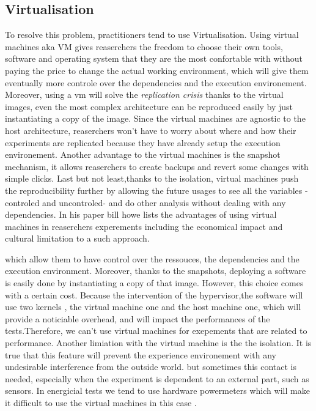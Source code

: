 \subsection{Virtualisation}
To resolve this problem, practitioners tend to use Virtualisation. Using virtual machines aka VM gives reaserchers the freedom to choose their own tools, software and operating system that they are the most confortable with without paying the price to change the actual working environment, which will give them eventually more controle over the dependencies and the execution environement. Moreover, using a vm will solve the \emph{replication crisis} thanks to the virtual images, even the most complex architecture can be reproduced easily by just instantiating a copy of the image. Since the virtual machines are agnostic to the host architecture, reaserchers won't have to worry about where and how their experiments are replicated because they have already setup the execution environement. Another advantage to the virtual machines is the snapshot mechanism, it allows reaserchers to create backups and revert some changes with simple clicks. Last but not least,thanks to the isolation, virtual machines push the reproducibility further by allowing the future usages to see all the variables -controled and uncontroled-  and do other analysis without dealing with any dependencies. In his paper \cite{howe_virtual_2012} bill howe lists the advantages of using virtual machines in reaserchers experements including the economical impact and cultural limitation to a such approach.

which allow them to have control over the ressouces, the dependencies and the execution environment. Moreover, thanks to the snapshots, deploying a software is easily done by instantiating a copy of that image.
However, this choice comes with a certain cost. Because the intervention of the hypervisor,the software will use two kernels , the virtual machine one and the host machine one, which will provide a noticiable overhead, and will impact the performances of the tests.Therefore, we can't use virtual machines for exepements that are related to performance. Another limiation with the virtual machine is the the isolation. It is true that this feature will prevent the experience environement with any undesirable interference from the outside world. but sometimes this contact is needed, especially when the experiment is dependent to an external part, such as sensors. In energicial tests we tend to use hardware powermeters which will make it difficult to use the virtual machines in this case .

